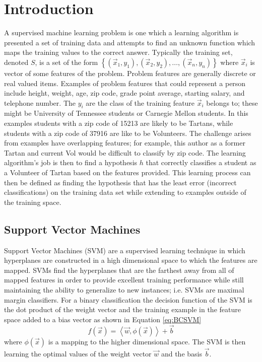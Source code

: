 \section{Introduction}

A supervised machine learning problem is one which a learning algorithm is presented a set of training data and attempts to find an unknown function which maps the training values to the correct answer.
Typically the training set, denoted $S$, is a set of the form $\left \{ (\vec{x}_1,y_1), (\vec{x}_2,y_2), \dots, (\vec{x}_n,y_n) \right \}$ where $\vec{x}_i$ is vector of some features of the problem.
Problem features are generally discrete or real valued items.
Examples of problem features that could represent a person include height, weight, age, zip code, grade point average, starting salary, and telephone number.
The $y_i$ are the class of the training feature $\vec{x}_i$ belongs to; these might be University of Tennessee students or Carnegie Mellon students.
In this examples students with a zip code of 15213 are likely to be Tartans, while students with a zip code of 37916 are like to be Volunteers.
The challenge arises from examples have overlapping features; for example, this author as a former Tartan and current Vol would be difficult to classify by zip code.
The learning algorithm's job is then to find a hypothesis $h$ that correctly classifies a student as a Volunteer of Tartan based on the features provided.
This learning process can then be defined as finding the hypothesis that has the least error (incorrect classifications) on the training data set while extending to examples outside of the training space.

\subsection{Support Vector Machines}
Support Vector Machines (SVM) are a supervised learning technique in which hyperplanes are constructed in a high dimensional space to which the features are mapped.
SVMs find the hyperplanes that are the farthest away from all of mapped features in order to provide excellent training performance while still maintaining the ability to generalize to new instances; i.e. SVMs are maximal margin classifiers.
For a binary classification the decision function of the SVM is the dot product of the weight vector and the training example in the feature space added to a bias vector as shown in Equation \ref{eq:BCSVM}
\begin{equation}
\label{eq:BCSVM}
f \left ( \vec{x} \right ) = \left \langle \vec{w} , \phi(\vec{x}) \right \rangle + \vec{b}
\end{equation}
where $\phi(\vec{x})$ is a mapping to the higher dimensional space.
The SVM is then learning the optimal values of the weight vector $\vec{w}$ and the basis $\vec{b}$.

